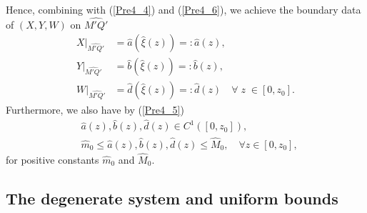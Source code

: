 \documentclass[3p,11pt]{elsarticle}
\numberwithin{equation}{section}
\begin{document}
Hence, combining with (\ref{Pre4_4}) and (\ref{Pre4_6}), we achieve the boundary data of $({X}, {Y}, W)$ on $\widehat{M'Q'}$
\begin{equation}\label{Sol1_3}
\begin{split}
    {X}|_{\widehat{M'Q'}} &= \hat{a}(\hat{\xi}(z)) =: \hat{a}(z), \\
    { Y}|_{\widehat{M'Q'}} &= \hat{b}(\hat{\xi}(z)) =: \hat{b}(z), \\
   W|_{\widehat{M'Q'}} &=\hat{d}(\hat{\xi}(z)) =: \hat{d}(z) \quad \forall \;z \; \in [0,z_0].
\end{split}
\end{equation}
Furthermore, we also have by (\ref{Pre4_5})
\begin{equation}\label{Sol1_4}
\begin{split}
    &\hat{a}(z), \hat{b}(z), \hat{d}(z) \in C^1([0,z_0]), \\
    &\hat{m}_0 \leq \hat{a}(z), \hat{b}(z), \hat{d}(z) \leq \hat{M}_0, \quad \forall z \in [0,z_0],
\end{split}
\end{equation}
for positive constants $\hat m_0$ and $\hat M_0$.

\subsection{The degenerate system and uniform bounds}
\end{document}
